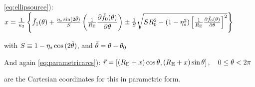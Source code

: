 \eqref{eq:ellipsource}): $x = \frac{1}{\kappa_2} \left\{\bar{f}_{1}(\theta) +%
\frac{\eta_s\sin(2\tilde{\theta})}{S}\left(\frac{1}{\re}\dfrac{\partial%
\bar{f}_0(\theta)}{\partial \theta}\right) \pm \frac{1}{S}\sqrt{SR_{0}^2 -%
(1-\eta_s^2)\left[ \frac{1}{\re}\frac{\partial \bar{f}_0(\theta)}{\partial
\theta}\right]^2}  \right\}$

with $ S \equiv 1-\eta_s\cos{(2\tilde{\theta})}$, and $\tilde{\theta} = \theta - \theta_0$

And again
\eqref{eq:parametricarcs}): $\vec{r}= \left[(R_{\mathrm{E}} +x)\cos{\theta},(R_{\mathrm{E}}+x)\sin{\theta}\right], \quad 0 \leq \theta < 2\pi$

are the Cartesian coordinates for this in parametric form.


{\bf }
